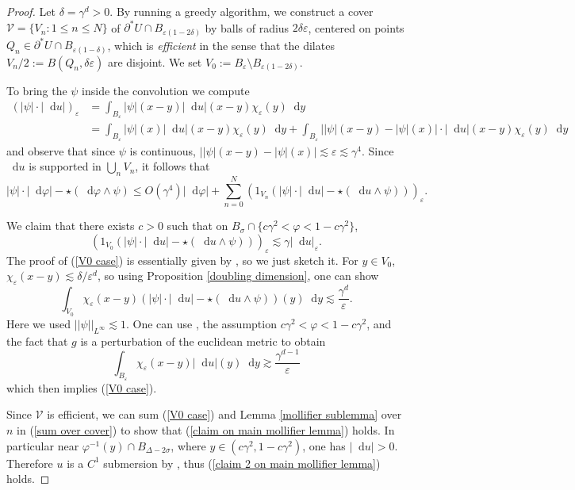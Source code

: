 \documentclass[reqno,12pt,letterpaper]{amsart}
\newcommand*\dif{\mathop{}\!\mathrm{d}}
\newcommand{\dfn}[1]{\emph{#1}\index{#1}}
\theoremstyle{definition}
\numberwithin{equation}{section}
\begin{document}
\begin{proof}
Let $\delta = \gamma^d > 0$.
By running a greedy algorithm, we construct a cover $\mathcal V = \{V_n: 1 \leq n \leq N\}$ of $\partial^* U \cap B_{\varepsilon(1 - 2\delta)}$ by balls of radius $2\delta\varepsilon$, centered on points $Q_n \in \partial^* U \cap B_{\varepsilon(1 - \delta)}$, which is \dfn{efficient} in the sense that the dilates $V_n/2 := B(Q_n, \delta\varepsilon)$ are disjoint.
We set $V_0 := B_\varepsilon \setminus B_{\varepsilon(1 - 2\delta)}$.

To bring the $\psi$ inside the convolution we compute
\begin{align*}
(|\psi| \cdot |\dif u|)_\varepsilon
&= \int_{B_\varepsilon} |\psi|(x - y) |\dif u|(x - y) \chi_\varepsilon(y) \dif y \\
&= \int_{B_\varepsilon} |\psi|(x) |\dif u|(x - y) \chi_\varepsilon(y) \dif y + \int_{B_\varepsilon} ||\psi|(x - y) - |\psi|(x)| \cdot |\dif u|(x - y) \chi_\varepsilon(y) \dif y
\end{align*}
and observe that since $\psi$ is continuous, $||\psi|(x - y) - |\psi|(x)| \lesssim \varepsilon \lesssim \gamma^4$.
Since $\dif u$ is supported in $\bigcup_n V_n$, it follows that
\begin{equation}\label{sum over cover}
|\psi| \cdot |\dif \varphi| - \star(\dif \varphi \wedge \psi)
\leq O(\gamma^4) |\dif \varphi| + \sum_{n=0}^N (1_{V_n}(|\psi| \cdot |\dif u| - \star(\dif u \wedge \psi)))_\varepsilon.
\end{equation}

We claim that there exists $c > 0$ such that on $B_\sigma \cap \{c\gamma^2 < \varphi < 1 - c\gamma^2\}$,
\begin{equation}\label{V0 case}
(1_{V_0}(|\psi| \cdot |\dif u| - \star(\dif u \wedge \psi)))_\varepsilon \lesssim \gamma |\dif u|_\varepsilon.
\end{equation}
The proof of (\ref{V0 case}) is essentially given by \cite[pg92]{Giusti77}, so we just sketch it.
For $y \in V_0$, $\chi_\varepsilon(x - y) \lesssim \delta/\varepsilon^d$, so using Proposition \ref{doubling dimension}, one can show
$$\int_{V_0} \chi_\varepsilon(x - y)(|\psi| \cdot |\dif u| - \star(\dif u \wedge \psi))(y) \dif y \lesssim \frac{\gamma^d}{\varepsilon}.$$
Here we used $||\psi||_{L^\infty} \lesssim 1$.
One can use \cite[Lemma 7.1]{Giusti77}, the assumption $c\gamma^2 < \varphi < 1 - c\gamma^2$, and the fact that $g$ is a perturbation of the euclidean metric to obtain
$$\int_{B_\varepsilon} \chi_\varepsilon(x - y) |\dif u|(y) \dif y \gtrsim \frac{\gamma^{d - 1}}{\varepsilon}$$
which then implies (\ref{V0 case}).

Since $\mathcal V$ is efficient, we can sum (\ref{V0 case}) and Lemma \ref{mollifier sublemma} over $n$ in (\ref{sum over cover}) to show that (\ref{claim on main mollifier lemma}) holds.
In particular near $\varphi^{-1}(y) \cap B_{\Delta - 2\sigma}$, where $y \in (c\gamma^2, 1 - c\gamma^2)$, one has $|\dif u| > 0$.
Therefore $u$ is a $C^1$ submersion by \cite[Lemma 7.1]{Giusti77}, thus (\ref{claim 2 on main mollifier lemma}) holds.
\end{proof}
\end{document}
